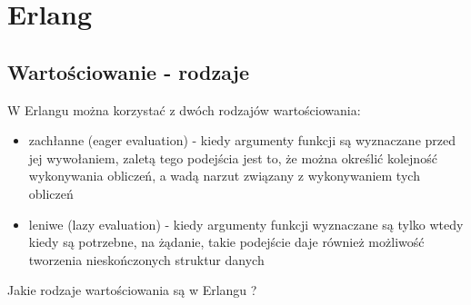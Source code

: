 \documentclass[a4paper,15pt]{article}
\newcommand{\ask}[2]{
    \begin{tcolorbox}[colback=black!5!white,colframe=gray,title={Pytanie #1}]
        #2
    \end{tcolorbox}
}
\begin{document}
\tableofcontents

\newpage
\section{Erlang}

\subsection{Wartościowanie - rodzaje}
W Erlangu można korzystać z dwóch rodzajów wartościowania:
\begin{itemize}
\item zachłanne (eager evaluation) - kiedy argumenty funkcji są wyznaczane przed jej wywołaniem, zaletą tego podejścia jest to, że można określić kolejność wykonywania obliczeń, a wadą narzut związany z wykonywaniem tych obliczeń
\item leniwe (lazy evaluation) - kiedy argumenty funkcji wyznaczane są tylko wtedy kiedy są potrzebne, na żądanie, takie podejście daje również możliwość tworzenia nieskończonych struktur danych
\end{itemize}

\ask{}{
Jakie rodzaje wartościowania są w Erlangu ?
}
\end{document}
